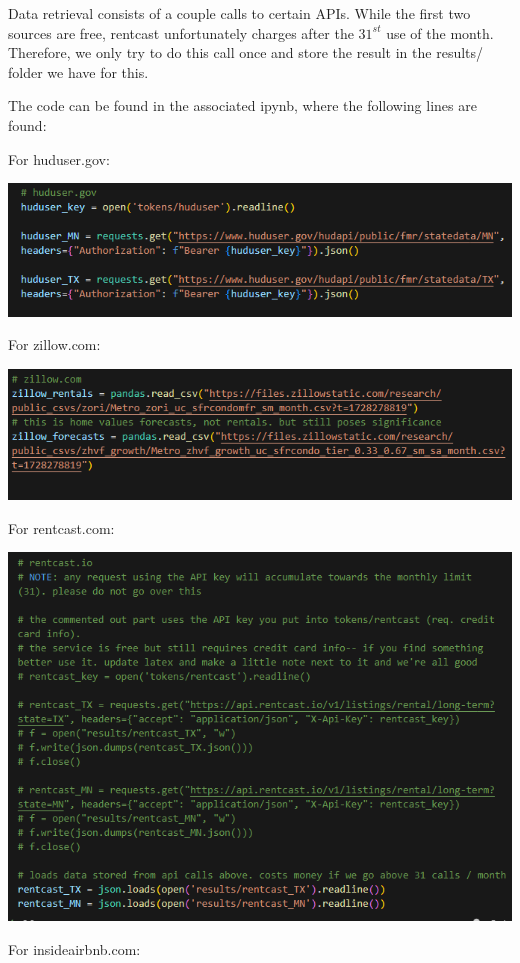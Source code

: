 \documentclass[a4paper]{article}
\begin{document}
\begin{enumerate}
  Data retrieval consists of a couple calls to certain APIs. While the first two sources are free, rentcast unfortunately charges after the $31^{st}$ use of the month. Therefore, we only try to do this call once and store the result in the results/ folder we have for this. 

  The code can be found in the associated ipynb, where the following lines are found: 

  For huduser.gov:

  \includegraphics[scale=0.82]{huduser_retrieval.png}

  For zillow.com:

  \includegraphics[scale=0.82]{zillow_retrieval.png}

  For rentcast.com:

  \includegraphics[scale=0.82]{rentcast_retrieval.png}

  For insideairbnb.com:


\end{enumerate}
\end{document}
